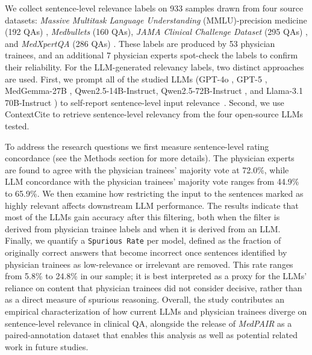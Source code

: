 \documentclass[fleqn,10pt]{wlscirep}
\def\ourmetric{\texttt{Spurious Rate}\xspace}
\begin{document}
We collect sentence-level relevance labels on 933 samples drawn from four source datasets: \textit{Massive Multitask Language Understanding}  (MMLU)-precision medicine (192 QAs) \cite{hendrycks_measuring_2021}, \textit{Medbullets} (160 QAs), \textit{JAMA Clinical Challenge Dataset} (295 QAs) \cite{chen_benchmarking_2025}, and \textit{MedXpertQA} (286 QAs) \cite{zuo_medxpertqa_2025}. These labels are produced by 53 physician trainees, and an additional 7 physician experts spot-check the labels to confirm their reliability.
For the LLM-generated relevancy labels, two distinct approaches are used. First, we prompt all of the studied LLMs (GPT-4o \cite{hurst2024gpt}, GPT-5 \cite{singh2025openai}, MedGemma-27B \cite{sellergren2025medgemma}, Qwen2.5-14B-Instruct, Qwen2.5-72B-Instruct \cite{qwen_qwen25_2025}, and Llama-3.1 70B-Instruct \cite{grattafiori_llama_2024}) to self-report sentence-level input relevance~\cite{choi_identifying_2024, wang-etal-2025-medcite}. Second, we use ContextCite \cite{cohen-wang_contextcite_2024} to retrieve sentence-level relevancy from the four open-source LLMs tested.


To address the research questions we first measure sentence-level rating concordance (see the Methods section for more details). The physician experts are found to agree with the physician trainees' majority vote at 72.0\%, while LLM concordance with the physician trainees' majority vote ranges from 44.9\% to 65.9\%. We then examine how restricting the input to the sentences marked as highly relevant affects downstream LLM performance. The results indicate that most of the LLMs gain accuracy after this filtering, both when the filter is derived from physician trainee labels and when it is derived from an LLM. Finally, we quantify a \ourmetric per model, defined as the fraction of originally correct answers that become incorrect once sentences identified by physician trainees as low-relevance or irrelevant are removed. This rate ranges from 5.8\% to 24.8\% in our sample; it is best interpreted as a proxy for the LLMs' reliance on content that physician trainees did not consider decisive, rather than as a direct measure of spurious reasoning. Overall, the study contributes an empirical characterization of how current LLMs and physician trainees diverge on sentence-level relevance in clinical QA, alongside the release of \emph{MedPAIR} as a paired-annotation dataset that enables this analysis as well as potential related work in future studies.  %
\end{document}
